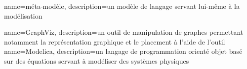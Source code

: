 {
	name={méta-modèle},
	description={un modèle de langage servant lui-même à la modélisation}	
}

{
	name=GraphViz, 
	description={un outil de manipulation de graphes permettant notamment la représentation graphique et le placement à l'aide de l'outil }
}
{
	name=Modelica, 
	description={un langage de programmation orienté objet basé sur des équations servant à modéliser des systèmes physiques}
}